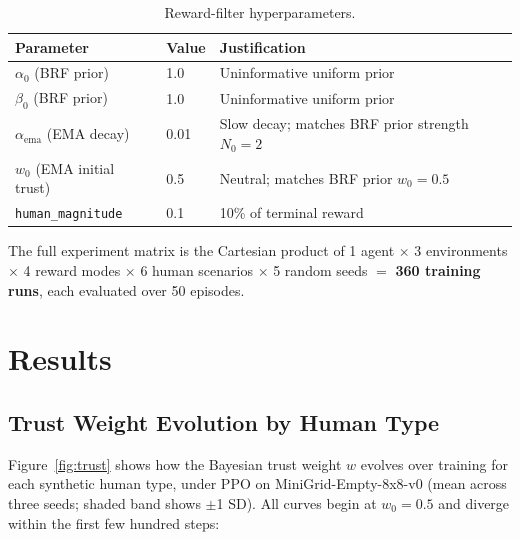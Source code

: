 \documentclass[11pt]{article}
\begin{document}
\begin{table}[H]
  \centering
  \caption{Reward-filter hyperparameters.}
  \label{tab:brf_hp}
  \begin{tabular}{@{}lll@{}}
    \toprule
    Parameter                      & Value & Justification               \\
    \midrule
    $\alpha_0$ (BRF prior)         & 1.0   & Uninformative uniform prior  \\
    $\beta_0$  (BRF prior)         & 1.0   & Uninformative uniform prior  \\
    $\alpha_{\mathrm{ema}}$ (EMA decay) & 0.01 & Slow decay; matches BRF prior strength $N_0=2$ \\
    $w_0$ (EMA initial trust)      & 0.5   & Neutral; matches BRF prior $w_0=0.5$ \\
    \texttt{human\_magnitude}      & 0.1   & 10\% of terminal reward     \\
    \bottomrule
  \end{tabular}
\end{table}

The full experiment matrix is the Cartesian product of 1 agent $\times$
3 environments $\times$ 4 reward modes $\times$ 6 human scenarios $\times$
5 random seeds $=$ \textbf{360 training runs}, each evaluated over 50
episodes.

\section{Results}

\subsection{Trust Weight Evolution by Human Type}

Figure~\ref{fig:trust} shows how the Bayesian trust weight $w$ evolves over
training for each synthetic human type, under PPO on MiniGrid-Empty-8x8-v0
(mean across three seeds; shaded band shows $\pm$1 SD). All curves begin at
$w_0 = 0.5$ and diverge within the first few hundred steps:
\end{document}
